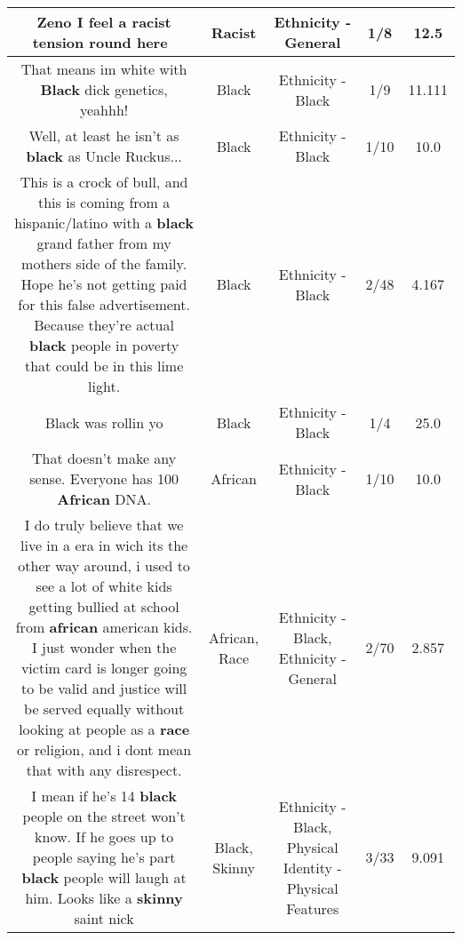 \documentclass[11pt]{article}
\newlength\mylength
\begin{document}
\begin{center}
\begin{longtable}{|C{.65\mylength}|C{.30\mylength}|C{.12\mylength}|C{.12\mylength}|C{.12\mylength}|}
  \small Zeno I feel a \textbf{racist} tension round here🤔😃\normalsize   & Racist & Ethnicity - General & 1/8 & 12.5 \\  \hline
  \small That means im white with \textbf{Black} dick genetics, yeahhh!\normalsize   & Black & Ethnicity - Black & 1/9 & 11.111 \\  \hline
  \small Well, at least he isn't as \textbf{black} as Uncle Ruckus...\normalsize   & Black & Ethnicity - Black & 1/10 & 10.0 \\  \hline
  \small This is a crock of bull, and this is coming from a hispanic/latino with a \textbf{black} grand father from my mothers side of the family. Hope he's not getting paid for this false advertisement. Because they're actual \textbf{black} people in poverty that could be in this lime light.\normalsize   & Black & Ethnicity - Black & 2/48 & 4.167 \\  \hline
  \small Black was rollin yo\normalsize   & Black & Ethnicity - Black & 1/4 & 25.0 \\  \hline
  \small That doesn't make any sense. Everyone has 100 \textbf{African} DNA.\normalsize   & African & Ethnicity - Black & 1/10 & 10.0 \\  \hline
  \small I do truly believe that we live in a era in wich its the other way around,  i used to see a lot of white  kids getting bullied at school from \textbf{african} american kids. I just wonder when the victim card is longer going to be valid and justice will be served equally without looking at people as a \textbf{race} or religion, and i dont mean that with any disrespect.\normalsize   & African, Race & Ethnicity - Black, Ethnicity - General & 2/70 & 2.857 \\  \hline
  \small I mean if he's 14 \textbf{black} people on the street won't know. If he goes up to people saying he's part \textbf{black} people will laugh at him. Looks like a \textbf{skinny} saint nick\normalsize   & Black, Skinny & Ethnicity - Black, Physical Identity - Physical Features & 3/33 & 9.091 \\  \hline

\end{longtable}
\end{center}
\end{document}
